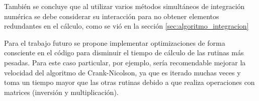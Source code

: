 \documentclass{article}
\begin{document}
También se concluye que al utilizar varios métodos simultáneos de integración numérica se debe considerar su interacción para no obtener elementos redundantes en el cálculo, como se vió en la sección \ref{sec:algoritmo_integracion}

Para el trabajo futuro se propone implementar optimizaciones de forma consciente en el código para disminuir el tiempo de cálculo de las rutinas más pesadas. Para este caso particular, por ejemplo, sería recomendable mejorar la velocidad del algoritmo de Crank-Nicolson, ya que es iterado muchas veces y toma un tiempo mayor que las otras rutinas debido a que realiza operaciones con matrices (inversión y multiplicación).
\end{document}
